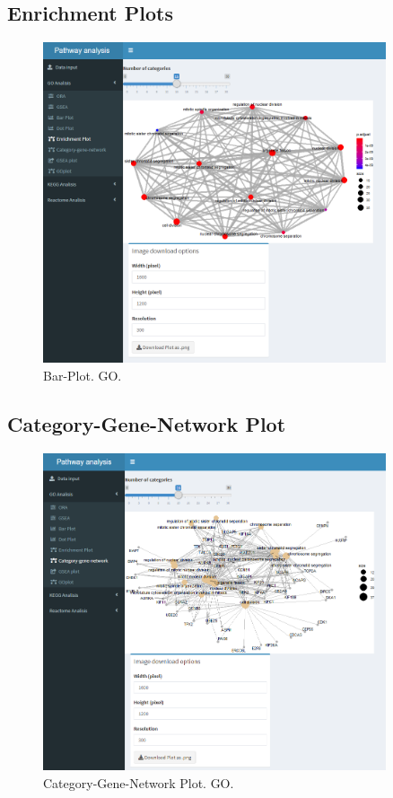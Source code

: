 \documentclass[]{article}
\begin{document}
\subsection{Enrichment Plots}

\begin{figure}[H]
\centering
\includegraphics[width=0.9\textwidth]{App_F16_Items_GO_Emap.png} 
\caption{Bar-Plot. GO.}
\end{figure}

\subsection{Category-Gene-Network Plot}

\begin{figure}[H]
\centering
\includegraphics[width=0.9\textwidth]{App_F17_Items_GO_CnetPlot.png} 
\caption{Category-Gene-Network Plot. GO.}
\end{figure}
\end{document}
